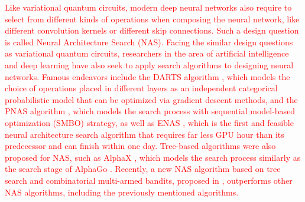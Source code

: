 \documentclass[a4paper,onecolumn,11pt]{quantumarticle}
\begin{document}
\textcolor{red}{Like variational quantum circuits, modern deep neural networks also require to select from different kinds of operations when composing the neural network, like different convolution kernels or different skip connections. Such a design question is called Neural Architecture Search (NAS). Facing the similar design questions as variational quantum circuits, researchers in the area of artificial intelligence and deep learning have also seek to apply search algorithms to designing neural networks. Famous endeavors include the DARTS algorithm \cite{DARTS_DBLP:conf/iclr/LiuSY19}, which models the choice of operations placed in different layers as an independent categorical probabilistic model that can be optimized via gradient descent methods, and the PNAS algorithm \cite{PNAS10.1007/978-3-030-01246-5_2}, which models the search process with sequential model-based optimization (SMBO) strategy, as well as ENAS \cite{ENASpmlr-v80-pham18a}, which is the first and feasible neural architecture search algorithm that requires far less GPU hour than its predecessor and can finish within one day. Tree-based algorithms were also proposed for NAS, such as AlphaX \cite{AlphaXDBLP:conf/aaai/WangZJTF20}, which models the search process similarly as the search stage of AlphaGo \cite{AlphaGoDBLP:journals/nature/SilverHMGSDSAPL16}. Recently, a new NAS algorithm based on tree search and combinatorial multi-armed bandits, proposed in \cite{huang2021neural}, outperforms other NAS algorithms, including the previously mentioned algorithms.}
\end{document}
